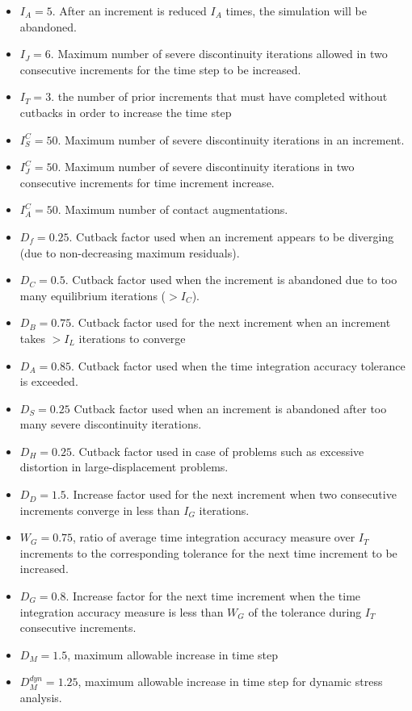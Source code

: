 \documentclass[10pt,letterpaper,oneside]{report}
\begin{document}
\begin{itemize}
\begin{itemize}
\item $I_A = 5$.  After an increment is reduced $I_A$ times, the simulation will be abandoned.  
\item $I_J =6 $.  Maximum number of severe discontinuity iterations allowed in two consecutive increments for the time step to be increased.
\item $I_T = 3$. the number of prior increments that must have completed without cutbacks in order to increase the time step
\item $I_S^C = 50$.  Maximum number of severe discontinuity iterations in an increment.
\item $I_J^C = 50$.  Maximum number of severe discontinuity iterations in two consecutive increments for time increment increase.
\item $I_A^C = 50$.  Maximum number of contact augmentations.
\item $D_f = 0.25$.  Cutback factor used when an increment appears to be diverging (due to non-decreasing maximum residuals).
\item $D_C = 0.5$.   Cutback factor used when the increment is abandoned due to too many equilibrium iterations ($ > I_C$).
\item $D_B = 0.75$.  Cutback factor used for the next increment when an increment takes $> I_L$ iterations to converge
\item $D_A = 0.85$.  Cutback factor used when the time integration accuracy tolerance is exceeded.
\item $D_S = 0.25 $  Cutback factor used when an increment is abandoned after too many severe discontinuity iterations. 
\item $D_H = 0.25$.  Cutback factor used in case of problems such as excessive distortion in large-displacement problems.  
\item $D_D = 1.5$.  Increase factor used for the next increment when two consecutive increments converge in less than $I_G$ iterations.
\item $W_G = 0.75$, ratio of average time integration accuracy measure over $I_T$ increments to the corresponding tolerance for the next time increment to be increased.
\item $D_G = 0.8$.  Increase factor for the next time increment when the time integration accuracy measure is less than $W_G$ of the tolerance during $I_T$ consecutive increments.
\item $D_M = 1.5$, maximum allowable increase in time step
\item $D_M^{dyn} = 1.25$, maximum allowable increase in time step for dynamic stress analysis.

\end{itemize}
\end{itemize}
\end{document}
